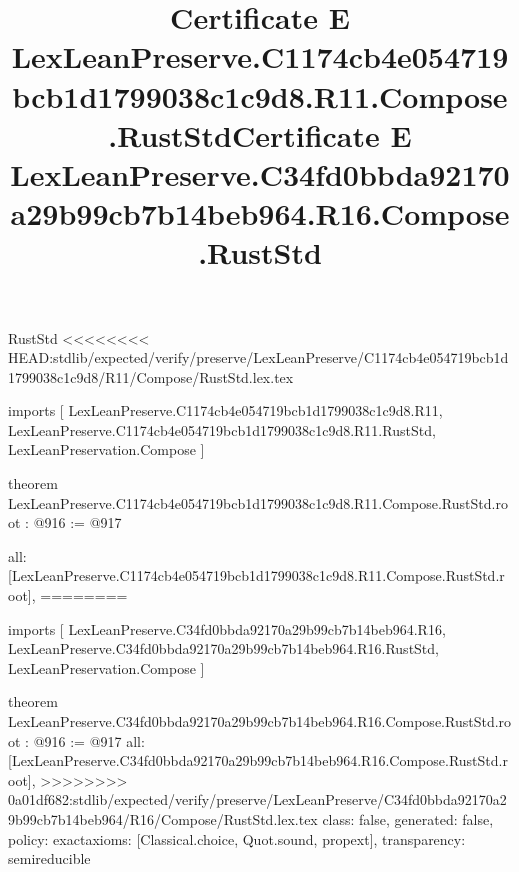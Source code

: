 \begin{lexlean}{RustStd}
<<<<<<<< HEAD:stdlib/expected/verify/preserve/LexLeanPreserve/C1174cb4e054719bcb1d1799038c1c9d8/R11/Compose/RustStd.lex.tex
\title{Certificate E LexLeanPreserve.C1174cb4e054719bcb1d1799038c1c9d8.R11.Compose.RustStd}
\begin{coremodule}
imports [
  LexLeanPreserve.C1174cb4e054719bcb1d1799038c1c9d8.R11,
  LexLeanPreserve.C1174cb4e054719bcb1d1799038c1c9d8.R11.RustStd,
  LexLeanPreservation.Compose
]

theorem LexLeanPreserve.C1174cb4e054719bcb1d1799038c1c9d8.R11.Compose.RustStd.root : @916 := @917 {
  all: [LexLeanPreserve.C1174cb4e054719bcb1d1799038c1c9d8.R11.Compose.RustStd.root],
========
\title{Certificate E LexLeanPreserve.C34fd0bbda92170a29b99cb7b14beb964.R16.Compose.RustStd}
\begin{coremodule}
imports [
  LexLeanPreserve.C34fd0bbda92170a29b99cb7b14beb964.R16,
  LexLeanPreserve.C34fd0bbda92170a29b99cb7b14beb964.R16.RustStd,
  LexLeanPreservation.Compose
]

theorem LexLeanPreserve.C34fd0bbda92170a29b99cb7b14beb964.R16.Compose.RustStd.root : @916 := @917 {
  all: [LexLeanPreserve.C34fd0bbda92170a29b99cb7b14beb964.R16.Compose.RustStd.root],
>>>>>>>> 0a01df682:stdlib/expected/verify/preserve/LexLeanPreserve/C34fd0bbda92170a29b99cb7b14beb964/R16/Compose/RustStd.lex.tex
  class: false,
  generated: false,
  policy: exact{axioms: [Classical.choice, Quot.sound, propext]},
  transparency: semireducible
}


\end{coremodule}}
\end{coremodule}
\end{lexlean}
